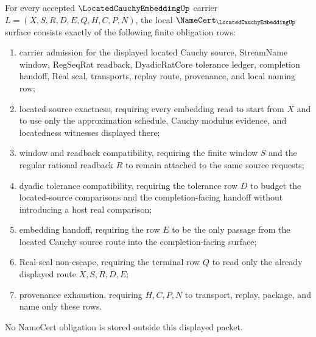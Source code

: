 \begin{theorem}
\label{thm:located-cauchy-embedding-namecert-obligations}
For every accepted $\LocatedCauchyEmbeddingUp$ carrier
$L=(X,S,R,D,E,Q,H,C,P,N)$, the local $\NameCert_{\LocatedCauchyEmbeddingUp}$ surface consists exactly of the following finite obligation rows:
\begin{enumerate}
\item carrier admission for the displayed located Cauchy source, StreamName window, RegSeqRat readback, DyadicRatCore tolerance ledger, completion handoff, Real seal, transports, replay route, provenance, and local naming row;
\item located-source exactness, requiring every embedding read to start from $X$ and to use only the approximation schedule, Cauchy modulus evidence, and locatedness witnesses displayed there;
\item window and readback compatibility, requiring the finite window $S$ and the regular rational readback $R$ to remain attached to the same source requests;
\item dyadic tolerance compatibility, requiring the tolerance row $D$ to budget the located-source comparisons and the completion-facing handoff without introducing a host real comparison;
\item embedding handoff, requiring the row $E$ to be the only passage from the located Cauchy source route into the completion-facing surface;
\item Real-seal non-escape, requiring the terminal row $Q$ to read only the already displayed route $X,S,R,D,E$;
\item provenance exhaustion, requiring $H,C,P,N$ to transport, replay, package, and name only these rows.
\end{enumerate}
No NameCert obligation is stored outside this displayed packet.
\end{theorem}
